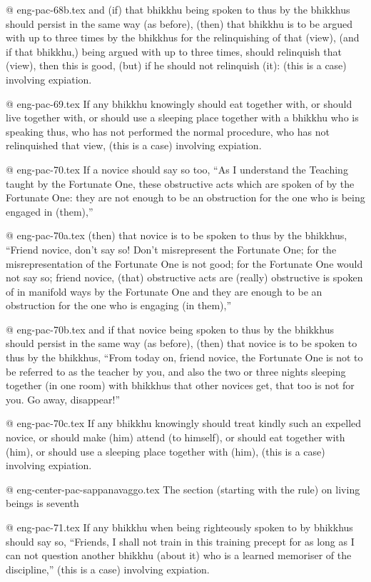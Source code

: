 @ eng-pac-68b.tex
and (if) that bhikkhu being spoken to thus by the bhikkhus should persist in the same way (as before), (then) that bhikkhu is to be argued with up to three times by the bhikkhus for the relinquishing of that (view), (and if that bhikkhu,) being argued with up to three times, should relinquish that (view), then this is good, (but) if he should not relinquish (it): (this is a case) involving expiation.

@ eng-pac-69.tex
If any bhikkhu knowingly should eat together with, or should live together with, or should use a sleeping place together with a bhikkhu who is speaking thus, who has not performed the normal procedure, who has not relinquished that view, (this is a case) involving expiation.

@ eng-pac-70.tex
If a novice should say so too, “As I understand the Teaching taught by the Fortunate One, these obstructive acts which are spoken of by the Fortunate One: they are not enough to be an obstruction for the one who is being engaged in (them),”

@ eng-pac-70a.tex
(then) that novice is to be spoken to thus by the bhikkhus, “Friend novice, don't say so! Don't misrepresent the Fortunate One; for the misrepresentation of the Fortunate One is not good; for the Fortunate One would not say so; friend novice, (that) obstructive acts are (really) obstructive is spoken of in manifold ways by the Fortunate One and they are enough to be an obstruction for the one who is engaging (in them),”

@ eng-pac-70b.tex
and if that novice being spoken to thus by the bhikkhus should persist in the same way (as before), (then) that novice is to be spoken to thus by the bhikkhus, “From today on, friend novice, the Fortunate One is not to be referred to as the teacher by you, and also the two or three nights sleeping together (in one room) with bhikkhus that other novices get, that too is not for you. Go away, disappear!”

@ eng-pac-70c.tex
If any bhikkhu knowingly should treat kindly such an expelled novice, or should make (him) attend (to himself), or should eat together with (him), or should use a sleeping place together with (him), (this is a case) involving expiation.

@ eng-center-pac-sappanavaggo.tex
The section (starting with the rule) on living beings is seventh

@ eng-pac-71.tex
If any bhikkhu when being righteously spoken to by bhikkhus should say so, “Friends, I shall not train in this training precept for as long as I can not question another bhikkhu (about it) who is a learned memoriser of the discipline,” (this is a case) involving expiation.

